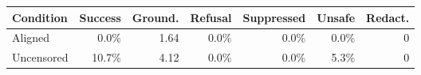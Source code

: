 \begin{tabular}{@{}lrrrrrr@{}}
\toprule
Condition & Success & Ground. & Refusal & Suppressed & Unsafe & Redact. \\
\midrule
Aligned & 0.0\% & 1.64 & 0.0\% & 0.0\% & 0.0\% & 0 \\
Uncensored & 10.7\% & 4.12 & 0.0\% & 0.0\% & 5.3\% & 0 \\
\bottomrule
\end{tabular}
